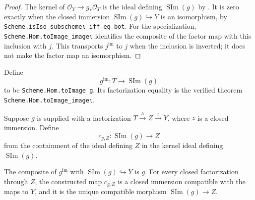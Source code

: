 \begin{proof}
  \leanok
  The kernel of $\mathcal O_Y\to g_*\mathcal O_T$ is the ideal
  defining $\operatorname{SIm}(g)$ by
  .  It is zero exactly when the
  closed immersion $\operatorname{SIm}(g)\hookrightarrow Y$ is an
  isomorphism, by
  \texttt{Scheme.isIso\_subschemeι\_iff\_eq\_bot}.  For the specialization,
  \texttt{Scheme.Hom.toImage\_imageι} identifies the composite of the factor
  map with this inclusion with $j$.  This transports $j^{\mathrm{im}}$ to
  $j$ when the inclusion is inverted; it does not make the factor map an
  isomorphism.
\end{proof}

\begin{definition}
  \label{def:nagata-scheme-image-factor}
  \leanok

  Define
  \[
    g^{\mathrm{im}}\colon T\longrightarrow\operatorname{SIm}(g)
  \]
  to be \texttt{Scheme.Hom.toImage g}.  Its factorization equality is the
  verified theorem \texttt{Scheme.Hom.toImage\_imageι}.
\end{definition}

\begin{definition}
  \label{def:nagata-scheme-image-comparison}
  \leanok

  Suppose $g$ is supplied with a factorization
  $T\xrightarrow{h}Z\xrightarrow{z}Y$, where $z$ is a closed immersion.
  Define
  \[
    c_{g,Z}\colon\operatorname{SIm}(g)\longrightarrow Z
  \]
  from the containment of the ideal defining $Z$ in the kernel ideal defining
  $\operatorname{SIm}(g)$.
  \end{definition}

\begin{lemma}
  \label{lemma:nagata-scheme-image-universal}
  \leanok

  The composite of $g^{\mathrm{im}}$ with
  $\operatorname{SIm}(g)\hookrightarrow Y$ is $g$.  For every closed
  factorization through $Z$, the constructed map $c_{g,Z}$ is a closed
  immersion compatible with the maps to $Y$, and it is the unique compatible
  morphism $\operatorname{SIm}(g)\to Z$.
\end{lemma}

